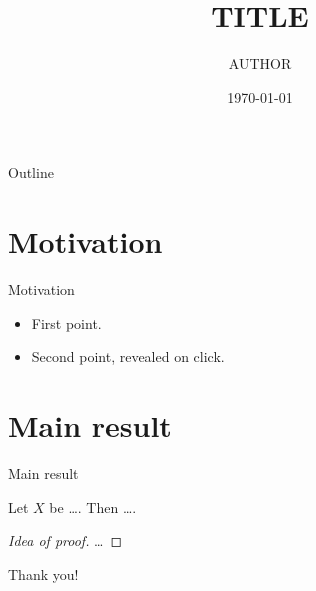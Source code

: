 \documentclass[11pt,aspectratio=169]{beamer}
\title{{{TITLE}}}
\author{{{AUTHOR}}}
\institute{Department of Mathematics, University}
\date{\today}
\begin{document}
\begin{frame}
  \titlepage
\end{frame}

\begin{frame}{Outline}
  \tableofcontents
\end{frame}

\section{Motivation}
\begin{frame}{Motivation}
  \begin{itemize}
    \item First point.
    \item<2-> Second point, revealed on click.
  \end{itemize}
\end{frame}

\section{Main result}
\begin{frame}{Main result}
  \begin{theorem}
    Let $X$ be \dots. Then \dots.
  \end{theorem}
  \begin{proof}[Idea of proof]
    \dots
  \end{proof}
\end{frame}

\begin{frame}
  \centering \Large Thank you!
\end{frame}
\end{document}
